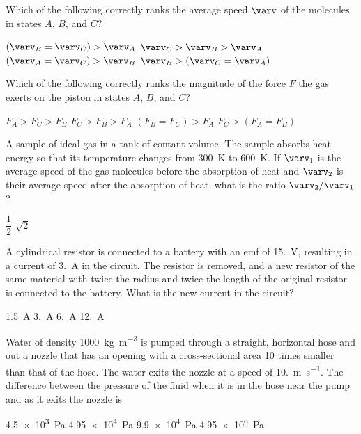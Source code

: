 \documentclass[12pt]{exam}
\begin{document}
\begin{questions}
  \question Which of the following correctly ranks the average speed $\varv$ of
  the molecules in states $A$, $B$, and $C$?
  \label{cylinder1}
  \begin{choices}
    \choice $(\varv_B=\varv_C)>\varv_A$
    \choice $\varv_C>\varv_B>\varv_A$
    \choice $(\varv_A=\varv_C)>\varv_B$
    \choice $\varv_B>(\varv_C=\varv_A)$
  \end{choices}

  \question Which of the following correctly ranks the magnitude of the force
  $F$ the gas exerts on the piston in states $A$, $B$, and $C$?
  \label{cylinder2}
  \begin{choices}
    \choice $F_A>F_C>F_B$
    \choice $F_C>F_B>F_A$
    \choice $(F_B=F_C)>F_A$
    \choice $F_C>(F_A=F_B)$
  \end{choices}

  \question A sample of ideal gas in a tank of contant volume. The sample
  absorbs heat energy so that its temperature changes from \SI{300}{\kelvin} to
  \SI{600}{\kelvin}. If $\varv_1$ is the average speed of the gas molecules
  before the absorption of heat and $\varv_2$ is their average speed after the
  absorption of heat, what is the ratio $\varv_2/\varv_1$?
  \begin{choices}
    \choice $\dfrac12$
    \choice $\sqrt2$
  \end{choices}
  
  \question A cylindrical resistor is connected to a battery with an emf of
  \SI{15.}{\volt}, resulting in a current of \SI{3.}{\ampere} in the circuit.
  The resistor is removed, and a new resistor of the same material with twice
  the radius and twice the length of the original resistor is connected to the
  battery. What is the new current in the circuit?
  \begin{choices}
    \choice \SI{1.5}{\ampere}
    \choice \SI{3.}{\ampere}
    \choice \SI{6.}{\ampere}
    \choice \SI{12.}{\ampere}
  \end{choices}

  \question Water of density \SI{1000}{\kilo\gram\per\metre\cubed} is pumped
  through a straight, horizontal hose and out a nozzle that has an opening with
  a cross-sectional area 10 times smaller than that of the hose. The water
  exits the nozzle at a speed of \SI{10.}{\metre\per\second}. The difference
  between the pressure of the fluid when it is in the hose near the pump and as
  it exits the nozzle is
  \begin{choices}
    \choice \SI{4.5e3}{\pascal}
    \choice \SI{4.95e4}{\pascal}
    \choice \SI{9.9e4}{\pascal}
    \choice \SI{4.95e6}{\pascal}
  \end{choices}


\end{questions}
\end{document}
